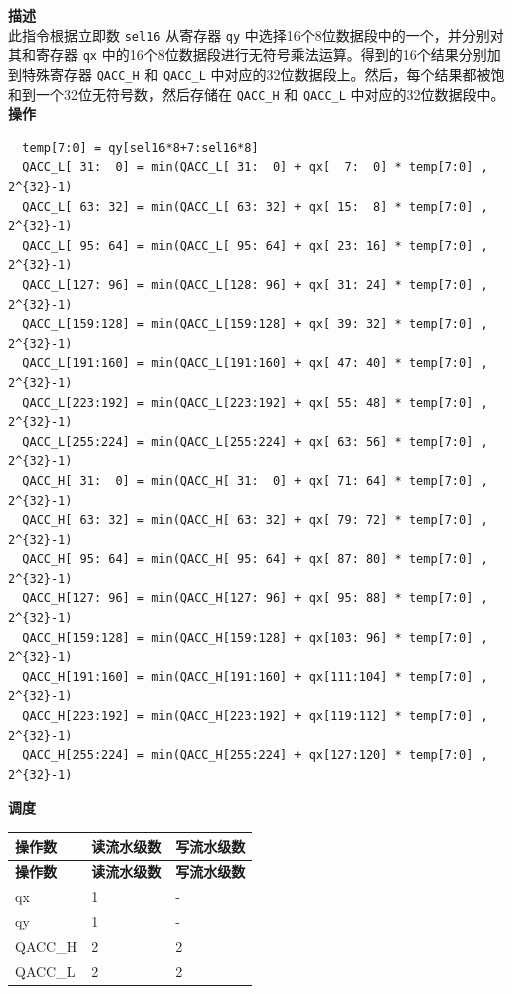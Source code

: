 \textbf{描述}\\
此指令根据立即数 \lstinline{sel16} 从寄存器 \lstinline{qy} 中选择16个8位数据段中的一个，并分别对其和寄存器 \lstinline{qx} 中的16个8位数据段进行无符号乘法运算。得到的16个结果分别加到特殊寄存器 \lstinline{QACC_H} 和 \lstinline{QACC_L} 中对应的32位数据段上。然后，每个结果都被饱和到一个32位无符号数，然后存储在 \lstinline{QACC_H} 和 \lstinline{QACC_L} 中对应的32位数据段中。\\
\textbf{操作}
\begin{lstlisting}
  temp[7:0] = qy[sel16*8+7:sel16*8]
  QACC_L[ 31:  0] = min(QACC_L[ 31:  0] + qx[  7:  0] * temp[7:0] , 2^{32}-1)
  QACC_L[ 63: 32] = min(QACC_L[ 63: 32] + qx[ 15:  8] * temp[7:0] , 2^{32}-1)
  QACC_L[ 95: 64] = min(QACC_L[ 95: 64] + qx[ 23: 16] * temp[7:0] , 2^{32}-1)
  QACC_L[127: 96] = min(QACC_L[128: 96] + qx[ 31: 24] * temp[7:0] , 2^{32}-1)
  QACC_L[159:128] = min(QACC_L[159:128] + qx[ 39: 32] * temp[7:0] , 2^{32}-1)
  QACC_L[191:160] = min(QACC_L[191:160] + qx[ 47: 40] * temp[7:0] , 2^{32}-1)
  QACC_L[223:192] = min(QACC_L[223:192] + qx[ 55: 48] * temp[7:0] , 2^{32}-1)
  QACC_L[255:224] = min(QACC_L[255:224] + qx[ 63: 56] * temp[7:0] , 2^{32}-1)
  QACC_H[ 31:  0] = min(QACC_H[ 31:  0] + qx[ 71: 64] * temp[7:0] , 2^{32}-1)
  QACC_H[ 63: 32] = min(QACC_H[ 63: 32] + qx[ 79: 72] * temp[7:0] , 2^{32}-1)
  QACC_H[ 95: 64] = min(QACC_H[ 95: 64] + qx[ 87: 80] * temp[7:0] , 2^{32}-1)
  QACC_H[127: 96] = min(QACC_H[127: 96] + qx[ 95: 88] * temp[7:0] , 2^{32}-1)
  QACC_H[159:128] = min(QACC_H[159:128] + qx[103: 96] * temp[7:0] , 2^{32}-1)
  QACC_H[191:160] = min(QACC_H[191:160] + qx[111:104] * temp[7:0] , 2^{32}-1)
  QACC_H[223:192] = min(QACC_H[223:192] + qx[119:112] * temp[7:0] , 2^{32}-1)
  QACC_H[255:224] = min(QACC_H[255:224] + qx[127:120] * temp[7:0] , 2^{32}-1)

\end{lstlisting}

\textbf{调度}\\
\begin{longtable}[c]{|l|l|l|}
    \hline
    \rowcolor{lightgray}
    \textbf{操作数} & \textbf{读流水级数} & \textbf{写流水级数} \\\hline
    \endfirsthead
    \hline
    \rowcolor{lightgray}
     \textbf{操作数} & \textbf{读流水级数} & \textbf{写流水级数} \\\hline
    \endhead
    \hline
    \endfoot

     qx & 1 & - \\\hline
     qy & 1 & - \\\hline
     QACC\_H & 2 & 2 \\\hline
     QACC\_L & 2 & 2

\end{longtable}

